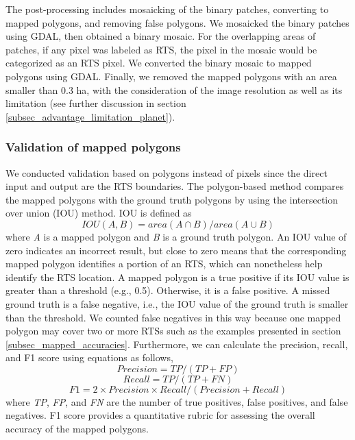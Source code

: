 \documentclass[authoryear,preprint,review,12pt]{elsarticle}
\begin{document}
The post-processing includes mosaicking of the binary patches, converting to mapped polygons, and removing false polygons. We mosaicked the binary patches using GDAL, then obtained a binary mosaic. For the overlapping areas of patches, if any pixel was labeled as RTS, the pixel in the mosaic would be categorized as an RTS pixel. We converted the binary mosaic to mapped polygons using GDAL. Finally, we removed the mapped polygons with an area smaller than 0.3 ha, with the consideration of the image resolution as well as its limitation (see further discussion in section \ref{subsec_advantage_limitation_planet}).  

\subsubsection{Validation of mapped polygons}
\label{subsubsec_validation}

We conducted validation based on polygons instead of pixels since the direct input and output are the RTS boundaries. The polygon-based method compares the mapped polygons with the ground truth polygons by using the intersection over union (IOU) method.  IOU is defined as 
\begin{equation}
IOU(A,B)=area(A \cap B)/area(A \cup B)
\label{equ_iou}
\end{equation}
where \emph{A} is a mapped polygon and \emph{B} is a ground truth polygon. An IOU value of zero indicates an incorrect result,  but close to zero means that the corresponding mapped polygon identifies a portion of an RTS, which can nonetheless help identify the RTS location. A mapped polygon is a true positive if its IOU value is greater than a threshold (e.g., 0.5). Otherwise, it is a false positive. 
A missed ground truth is a false negative, i.e., the IOU value of the ground truth %
is smaller than the threshold. We counted false negatives in this way because one mapped polygon may cover two or more RTSs such as the examples presented in section \ref{subsec_mapped_accuracies}. Furthermore, we can calculate the precision, recall, and F1 score using equations as follows,
\begin{equation}
Precision=TP/(TP+FP)
\label{equ_precision}
\end{equation}
\begin{equation}
Recall=TP/(TP+FN)
\label{equ_recall}
\end{equation}
\begin{equation}
F1=2 \times Precision \times Recall / (Precision + Recall)
\label{equ_f1score}
\end{equation}
where \emph{TP}, \emph{FP}, and \emph{FN} are the number of true positives, false positives, and false negatives. F1 score provides a quantitative rubric for assessing the overall accuracy of the mapped polygons.
\end{document}
